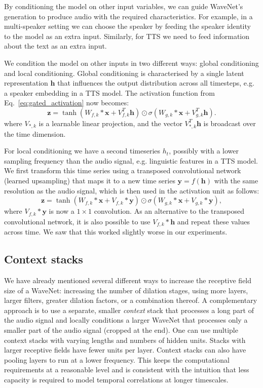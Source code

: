 \documentclass{article}
\makeatletter
\renewcommand{\vec}{\mathbf}
\newcommand{\eqnref}[1]{Eq.~\eqref{#1}}
\newcommand*{\eg}{e.g.\@\xspace}
\makeatother
\begin{document}
By conditioning the model on other input variables, we can guide WaveNet's generation to produce audio with the required characteristics. For example, in a multi-speaker setting we can choose the speaker by feeding the speaker identity to the model as an extra input. Similarly, for TTS we need to feed information about the text as an extra input.

We condition the model on other inputs in two different ways: global conditioning and local conditioning. Global conditioning is characterised by a single latent representation $\vec{h}$ that influences the output distribution across all timesteps, \eg a speaker embedding in a TTS model. The activation function from \eqnref{eq:gated_activation} now becomes:
$$
\vec{z} = \tanh \left(W_{f, k} \ast \vec{x} + V_{f, k}^T \vec{h}\right) \odot \sigma \left(W_{g, k} \ast \vec{x} + V_{g, k}^T \vec{h} \right). \label{eq:global_conditioning}
$$
where $V_{*, k}$ is a learnable linear projection, and the vector $V_{*, k}^T\vec{h}$ is broadcast over the time dimension.

For local conditioning we have a second timeseries $h_t$, possibly with a lower sampling frequency than the audio signal, \eg linguistic features in a TTS model. We first transform this time series using a transposed convolutional network (learned upsampling) that maps it to a new time series $\vec{y} = f(\vec{h})$ with the same resolution as the audio signal, which is then used in the activation unit as follows:
$$
\vec{z} = \tanh \left(W_{f, k} \ast \vec{x} + V_{f, k} \ast \vec{y}\right) \odot \sigma \left(W_{g, k} \ast \vec{x} + V_{g, k} \ast \vec{y}\right), \label{eq:local_conditioning}
$$
where $V_{f, k} \ast \vec{y}$ is now a $1\times 1$ convolution. As an alternative to the transposed convolutional network, it is also possible to use $V_{f, k} \ast \vec{h}$ and repeat these values across time. We saw that this worked slightly worse in our experiments.

\subsection{Context stacks}

We have already mentioned several different ways to increase the receptive field size of a WaveNet: increasing the number of dilation stages, using more layers, larger filters, greater dilation factors, or a combination thereof. A complementary approach is to use a separate, smaller \emph{context} stack that processes a long part of the audio signal and locally conditions a larger WaveNet that processes only a smaller part of the audio signal (cropped at the end). One can use multiple context stacks with varying lengths and numbers of hidden units. Stacks with larger receptive fields have fewer units per layer. Context stacks can also have pooling layers to run at a lower frequency. This keeps the computational requirements at a reasonable level and is consistent with the intuition that less capacity is required to model temporal correlations at longer timescales.
 
\end{document}
